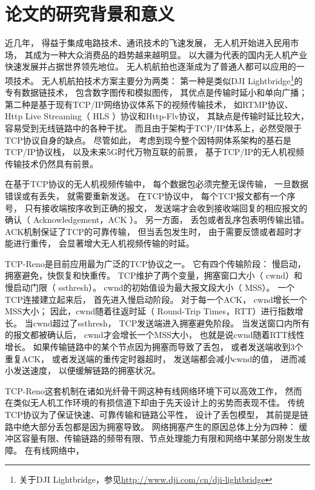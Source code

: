 \section{论文的研究背景和意义}
\par
近几年，
得益于集成电路技术、通讯技术的飞速发展，
无人机开始进入民用市场，
其成为一种大众消费品的趋势越来越明显。
以大疆为代表的国内无人机产业快速发展并占据世界领先地位。
无人机航拍也逐渐成为了普通人都可以应用的一项技术。
无人机航拍技术方案主要分为两类：
第一种是类似DJI Lightbridge\footnote{关于DJI Lightbridge，参见\url{http://www.dji.com/cn/dji-lightbridge}}的专有数据链技术，
包含数字图传和模拟图传，
其优点是传输时延小和单向广播；
第二种是基于现有TCP/IP网络协议体系下的视频传输技术，
如RTMP协议、Http Live Streaming（ HLS ）协议和Http-Flv协议，
其缺点是传输时延比较大，
容易受到无线链路中的各种干扰。
而且由于架构于TCP/IP体系上，必然受限于TCP协议自身的缺点。
尽管如此，
考虑到现今整个因特网体系架构的基石是TCP/IP协议栈，
以及未来5G时代万物互联的前景，
基于TCP/IP的无人机视频传输技术仍然具有前景。
\par
在基于TCP协议的无人机视频传输中，
每个数据包必须完整无误传输，
一旦数据错误或有丢失，
就需要重新发送。
在TCP协议中，
每个TCP报文都有一个序号，
只有接收端按序收到正确的报文，
发送端才会收到接收端回复的相应报文的确认（ Acknowledgement，ACK ）。
另一方面，
丢包或者乱序包表明传输出错。
ACK机制保证了TCP的可靠传输，
但当丢包发生时，
由于需要反馈或者超时才能进行重传，
会显著增大无人机视频传输的时延。
\par
TCP-Reno是目前应用最为广泛的TCP协议之一。
它有四个传输阶段：
慢启动，拥塞避免，快恢复和快重传。
TCP维护了两个变量，拥塞窗口大小（ cwnd）和慢启动门限（ ssthresh）。 
cwnd的初始值设为最大报文段大小（ MSS）。
一个TCP连接建立起来后，
首先进入慢启动阶段。
对于每一个ACK，
cwnd增长一个MSS大小；
因此，cwnd随着往返时延（ Round-Trip Times，RTT）进行指数增长。
当cwnd超过了ssthresh，
TCP发送端进入拥塞避免阶段。
当发送窗口内所有的报文都被确认后，
cwnd才会增长一个MSS大小，
也就是说cwnd随着RTT线性增长。
如果传输链路中的某个节点因为拥塞而导致了丢包，
或者发送端收到3个重复ACK，
或者发送端的重传定时器超时，
发送端都会减小cwnd的值，
进而减小发送速度，
以便缓解链路的拥塞状况。
\par
TCP-Reno这套机制在诸如光纤骨干网这种有线网络环境下可以高效工作，
然而在类似无人机工作环境的有损信道下却由于先天设计上的劣势而表现不佳。
传统TCP协议为了保证快速、可靠传输和链路公平性，
设计了丢包模型，
其前提是链路中绝大部分丢包都是因为拥塞导致。
网络拥塞产生的原因总体上分为四种：
缓冲区容量有限、传输链路的频带有限、节点处理能力有限和网络中某部分刚发生故障。
在有线网络中，
